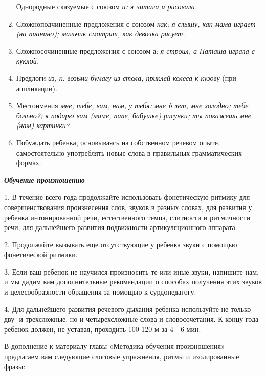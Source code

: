 \documentclass[a5paper]{book}
\renewcommand{\emph}[1]{\textit{#1}}
\begin{document}
\begin{enumerate}
  Однородные сказуемые с союзом \emph{и: я читала и рисовала.}
  
\item
  
  Сложноподчиненные предложения с союзом \emph{как: я слышу, как мама
  играет (на пианино); мальчик смотрит, как девочка рисует.}
  
\item
  
  Сложносочиненные предложения с союзом а: \emph{я строил, а Наташа
  играла с куклой.}
  
\item
  
  Предлоги \emph{из, к: возьми бумагу из стола; приклей колеса к кузову}
  (при аппликации).
  
\item
  
  Местоимения \emph{мне, тебе, вам, нам, у тебя: мне 6 лет, мне холодно;
  тебе больно?; я подарю вам (маме, папе, бабушке) рисунки; ты покажешь
  мне (нам) картинки?.}
  
\item
  
  Побуждать ребенка, основываясь на собственном речевом опыте,
  самостоятельно употреблять новые слова в правильных грамматических
  формах.
  
\end{enumerate}


\emph{\textbf{Обучение произношению}}

1. В течение всего года продолжайте использовать фонетическую ритмику
для совершенствования произнесения слов, звуков в разных словах, для
развития у ребенка интонированной речи, естественного темпа, слитности и
ритмичности речи, для дальнейшего развития подвижности артикуляционного
аппарата.

2. Продолжайте вызывать еще отсутствующие у ребенка звуки с помощью
фонетической ритмики.

3. Если ваш ребенок не научился произносить те или иные звуки, напишите
нам, и мы дадим вам дополнительные рекомендации о способах получения
этих звуков и целесообразности обращения за помощью к сурдопедагогу.

4. Для дальнейшего развития речевого дыхания ребенка используйте не
только дву- и трехсложные, но и четырехсложные слова и словосочетания. К
концу года ребенок должен, не уставая, проходить 100-120 м за 4---6 мин.

В дополнение к материалу главы «Методика обучения произношения»
предлагаем вам следующие слоговые упражнения, ритмы и изолированные
фразы:
\end{document}
